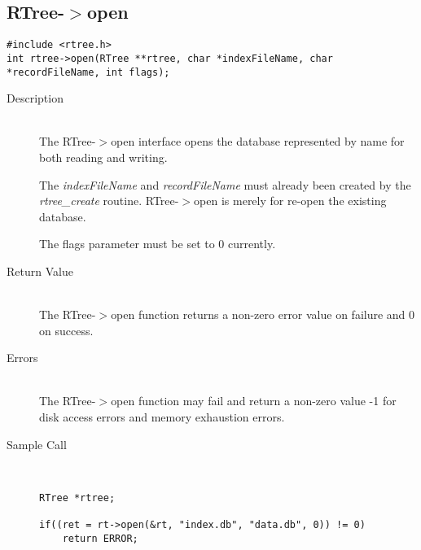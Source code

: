 \documentclass[12pt]{article}
\def\cdf{\sf }
\def\cdf{\sf }
\newcommand{\RTREE}{{\small{\cdf RTree}}}
\begin{document}
\newpage
\subsection{{\RTREE}-$>$open}
\begin{verbatim}
#include <rtree.h>
int rtree->open(RTree **rtree, char *indexFileName, char *recordFileName, int flags);
\end{verbatim}
\begin{description}
\item[Description]\ \\
  The {\RTREE}-$>$open interface opens the database represented by name for
  both reading and writing.

  The {\em indexFileName} and {\em recordFileName} must already
  been created by the {\em rtree\_create} routine.
  {\RTREE}-$>$open is merely for re-open the existing database.

  The flags parameter must be set to 0 currently.  

\item[Return Value]\ \\
  The {\RTREE}-$>$open function returns a non-zero error value on failure
  and 0 on success.
\item[Errors]\ \\
  The {\RTREE}-$>$open function may fail and return a non-zero
  value -1 for disk access errors and memory exhaustion errors.
\item[Sample Call]\ 
\begin{verbatim}
RTree *rtree;

if((ret = rt->open(&rt, "index.db", "data.db", 0)) != 0)
    return ERROR;
\end{verbatim}
\end{description}

\newpage
\end{document}
